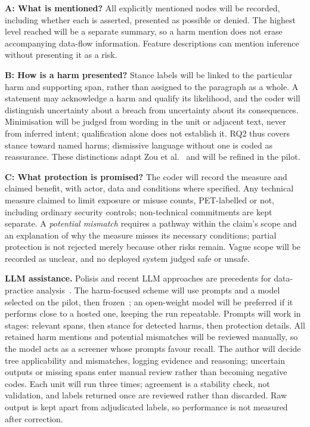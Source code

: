\documentclass[sigconf,nonacm,natbib=false]{acmart}
\begin{document}
\textbf{A: What is mentioned?} All explicitly mentioned nodes will be
recorded, including whether each is asserted, presented as possible or denied.
The highest level reached will be a separate summary, so a harm
mention does not erase accompanying data-flow information. Feature descriptions can mention inference without presenting it as a risk.

\textbf{B: How is a harm presented?} Stance labels will be linked to the
particular harm and supporting span, rather than assigned to the paragraph
as a whole. A statement may acknowledge a harm and qualify its likelihood,
and the coder will distinguish uncertainty about a breach from uncertainty
about its consequences. Minimisation will be judged from wording in the unit
or adjacent text, never from inferred intent; qualification alone does not
establish it. RQ2 thus covers stance toward named harms; dismissive language
without one is coded as reassurance. These distinctions adapt Zou et
al.~\parencite{zou2019might} and will be refined in the pilot.

\textbf{C: What protection is promised?} The coder will record the measure
and claimed benefit, with actor, data and conditions where specified. Any
technical measure claimed to limit exposure or misuse counts, PET-labelled or
not, including ordinary security controls; non-technical commitments are kept
separate. A \emph{potential mismatch} requires a pathway within the claim's
scope and an explanation of why the measure misses its necessary conditions;
partial protection is not rejected merely because other risks remain. Vague
scope will be recorded as unclear, and no deployed system judged safe or
unsafe.

\textbf{LLM assistance.} Polisis and recent LLM approaches are precedents for
data-practice analysis~\parencite{harkous2018polisis,rodriguez2024llm}. The
harm-focused scheme will use prompts and a model selected on the pilot, then
frozen~\parencite{tornberg2024best}; an open-weight model will be preferred if
it performs close to a hosted one, keeping the run repeatable. Prompts will
work in stages: relevant spans, then stance for detected harms, then
protection details. All retained harm mentions and potential mismatches will
be reviewed manually, so the model acts as a screener whose prompts favour
recall. The author will decide tree applicability and mismatches, logging
evidence and reasoning; uncertain outputs or missing spans enter manual
review rather than becoming negative codes. Each unit will run three times;
agreement is a stability check, not validation, and labels returned once are
reviewed rather than discarded. Raw output is kept apart from adjudicated
labels, so performance is not measured after correction.
\end{document}
